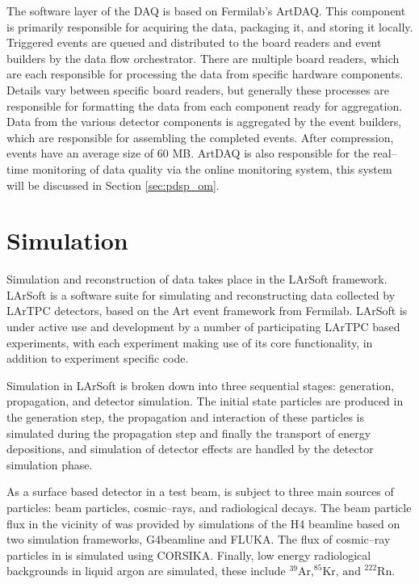The software layer of the \protodune{} DAQ is based on Fermilab's 
ArtDAQ\cite{6495515}. This component is primarily responsible for acquiring 
the data, packaging it, and storing it locally. Triggered events are queued 
and distributed to the board readers and event builders by the data flow 
orchestrator. There are multiple board readers, which are each responsible for 
processing the data from specific hardware components. Details vary between 
specific board readers, but generally these processes are responsible for 
formatting the data from each component ready for aggregation. Data from the 
various detector components is aggregated by the event builders, which are 
responsible for assembling the completed events. After compression, events have 
an average size of 60 MB. ArtDAQ is also responsible for the real--time 
monitoring of data quality via the online monitoring system, this system will 
be discussed in Section \ref{sec:pdsp_om}.

\section{Simulation} \label{sec:simulation}

Simulation and reconstruction of \protodune{} data takes place in the LArSoft
framework\cite{Snider2017}. LArSoft is a software suite for simulating and
reconstructing data collected by LArTPC detectors, based on the Art event 
framework from Fermilab\cite{Green:2012gv}. LArSoft is under active use and
development by a number of participating LArTPC based experiments, with each
experiment making use of its core functionality, in addition to experiment 
specific code. 

Simulation in LArSoft is broken down into three sequential stages: generation,
propagation, and detector simulation. The initial state particles are produced
in the generation step, the propagation and interaction of these particles is 
simulated during the propagation step and finally the transport of energy 
depositions, and simulation of detector effects are handled by the detector 
simulation phase.

As a surface based detector in a test beam, \protodune{} is subject to three
main sources of particles: beam particles, cosmic--rays, and radiological 
decays. The beam particle flux in the vicinity of \protodune{} was provided by 
simulations of the H4 beamline\cite{Booth:2019brj} based on two simulation 
frameworks, G4beamline\cite{g4beamline} and FLUKA\cite{BOHLEN2014211}. The flux
of cosmic--ray particles in \protodune{} is simulated using 
CORSIKA\cite{Heck:1998vt}.  Finally, low energy radiological backgrounds in 
liquid argon are simulated, these include $^{39}\mbox{Ar,} ^ {85}\mbox{Kr, and }
^{222}\mbox{Rn}$.

